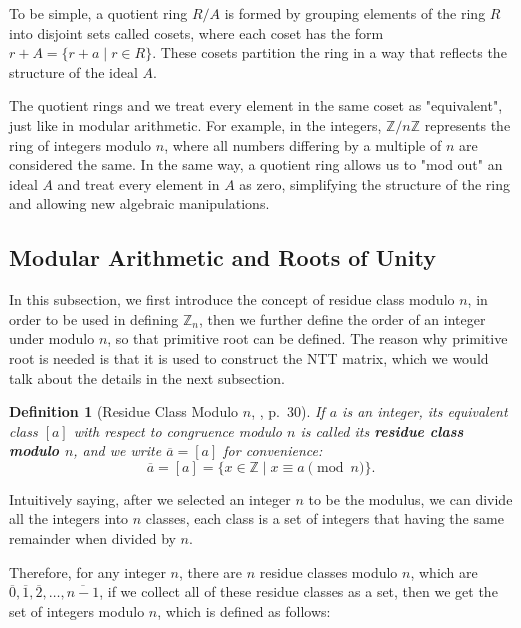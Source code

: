\documentclass[12pt]{article}
\newtheorem{definition}{Definition}[section]
\begin{document}
To be simple, 
a quotient ring $R/A$ is formed by grouping elements of the ring $R$ into disjoint sets called cosets, 
where each coset has the form $r + A = \{r + a \mid r \in R\}$. 
These cosets partition the ring in a way that reflects the structure of the ideal $A$.

The quotient rings and 
we treat every element in the same coset as "equivalent", just like in modular arithmetic. 
For example, in the integers, $\mathbb{Z}/n\mathbb{Z}$ represents the ring of integers modulo $n$, where all numbers differing by a multiple of $n$ are considered the same. 
In the same way, a quotient ring allows us to "mod out" an ideal $A$ and treat every element in $A$ as zero, simplifying the structure of the ring and allowing new algebraic manipulations.

\subsection{Modular Arithmetic and Roots of Unity}

In this subsection, we first introduce the concept of residue class modulo $n$, 
in order to be used in defining $\mathbb{Z}_n$, 
then we further define the order of an integer under modulo $n$, 
so that primitive root can be defined. 
The reason why primitive root is needed is that it is used to construct the NTT matrix, 
which we would talk about the details in the next subsection.

\begin{definition}[Residue Class Modulo $n$, \cite{algebra}, p.~30]
    If $a$ is an integer, its equivalent class $[a]$ with respect to congruence modulo $n$ is called its \textbf{residue class modulo $n$}, 
    and we write $\overline{a} = [a]$ for convenience: 
    \begin{equation}
    \overline{a} = [a] = \{x \in \mathbb{Z} \mid x \equiv a \pmod{n}\}.
    \end{equation}
\end{definition}

Intuitively saying, after we selected an integer $n$ to be the modulus, 
we can divide all the integers into $n$ classes, 
each class is a set of integers that having the same remainder when divided by $n$.

Therefore, for any integer $n$, there are $n$ residue classes modulo $n$, 
which are $\overline{0}, \overline{1}, \overline{2}, \ldots, \overline{n - 1}$, 
if we collect all of these residue classes as a set, 
then we get the set of integers modulo $n$, 
which is defined as follows:
\end{document}
